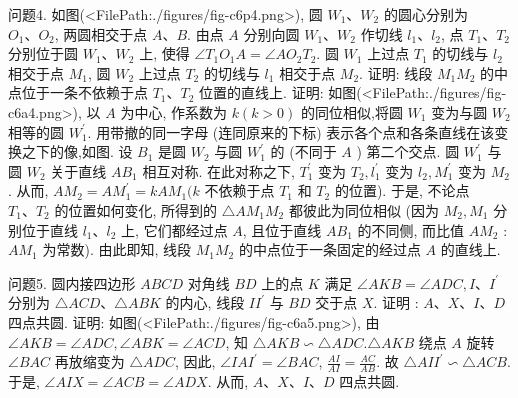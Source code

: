 问题4. 如图(<FilePath:./figures/fig-c6p4.png>), 圆 $W_1 、 W_2$ 的圆心分别为 $O_1 、 O_2$, 两圆相交于点 $A 、 B$. 由点 $A$ 分别向圆 $W_1 、 W_2$ 作切线 $l_1 、 l_2$, 点 $T_1 、 T_2$ 分别位于圆 $W_1 、 W_2$ 上, 使得 $\angle T_1 O_1 A=\angle A O_2 T_2$. 圆 $W_1$ 上过点 $T_1$ 的切线与 $l_2$ 相交于点 $M_1$, 圆 $W_2$ 上过点 $T_2$ 的切线与 $l_1$ 相交于点 $M_2$. 证明: 线段 $M_1 M_2$ 的中点位于一条不依赖于点 $T_1 、 T_2$ 位置的直线上.
证明: 如图(<FilePath:./figures/fig-c6a4.png>), 以 $A$ 为中心, 作系数为 $k(k>0)$ 的同位相似,将圆 $W_1$ 变为与圆 $W_2$ 相等的圆 $W_1^{\prime}$. 用带撤的同一字母 (连同原来的下标) 表示各个点和各条直线在该变换之下的像,如图.
设 $B_1$ 是圆 $W_2$ 与圆 $W_1^{\prime}$ 的 (不同于 $A$ ) 第二个交点.
圆 $W_1^{\prime}$ 与圆 $W_2$ 关于直线 $A B_1$ 相互对称.
在此对称之下, $T_1^{\prime}$ 变为 $T_2, l_1^{\prime}$ 变为 $l_2, M_1^{\prime}$ 变为 $M_2$. 从而, $A M_2=A M_1^{\prime}=k A M_1(k$ 不依赖于点 $T_1$ 和 $T_2$ 的位置). 于是, 不论点 $T_1 、 T_2$ 的位置如何变化, 所得到的 $\triangle A M_1 M_2$ 都彼此为同位相似 (因为 $M_2, M_1$ 分别位于直线 $l_1 、 l_2$ 上, 它们都经过点 $A$, 且位于直线 $A B_1$ 的不同侧, 而比值 $A M_2$ : $A M_1$ 为常数). 由此即知, 线段 $M_1 M_2$ 的中点位于一条固定的经过点 $A$ 的直线上.



问题5. 圆内接四边形 $A B C D$ 对角线 $B D$ 上的点 $K$ 满足 $\angle A K B=\angle A D C, I 、 I^{\prime}$ 分别为 $\triangle A C D 、 \triangle A B K$ 的内心, 线段 $I I^{\prime}$ 与 $B D$ 交于点 $X$. 证明 : $A 、 X 、 I 、 D$ 四点共圆.
证明: 如图(<FilePath:./figures/fig-c6a5.png>), 由 $\angle A K B=\angle A D C, \angle A B K= \angle A C D$, 知 $\triangle A K B \backsim \triangle A D C . \triangle A K B$ 绕点 $A$ 旋转 $\angle B A C$ 再放缩变为 $\triangle A D C$, 因此, $\angle I A I^{\prime}=\angle B A C$, $\frac{A I}{A I}=\frac{A C}{A B}$. 故 $\triangle A I I^{\prime} \backsim \triangle A C B$. 于是, $\angle A I X= \angle A C B=\angle A D X$. 从而, $A 、 X 、 I 、 D$ 四点共圆.



